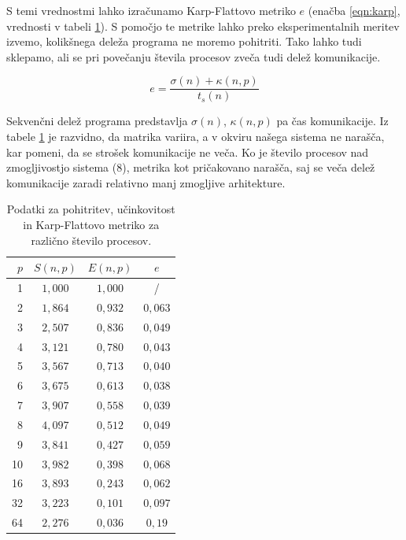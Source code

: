 \documentclass[a4paper,12pt]{book}
\begin{document}
S temi vrednostmi lahko izračunamo Karp-Flattovo metriko $e$ (enačba \ref{eqn:karp}, vrednosti v tabeli \ref{tab:efficiency-speedup-karp}). S pomočjo te metrike lahko preko eksperimentalnih meritev izvemo, kolikšnega deleža programa ne moremo pohitriti. Tako lahko tudi sklepamo, ali se pri povečanju števila procesov zveča tudi delež komunikacije. 

\begin{equation}
\label{eqn:karp}
e = \frac{\sigma(n) + \kappa(n,p)}{t_s(n)}
\end{equation}

Sekvenčni delež programa predstavlja $\sigma(n)$, $\kappa(n,p)$ pa čas komunikacije. Iz tabele \ref{tab:efficiency-speedup-karp} je razvidno, da matrika variira, a v okviru našega sistema ne narašča, kar pomeni, da se strošek komunikacije ne veča. Ko je število procesov nad zmogljivostjo sistema (8), metrika kot pričakovano narašča, saj se veča delež komunikacije zaradi relativno manj zmogljive arhitekture. 

\begin{table}
\centering
\caption{Podatki za pohitritev, učinkovitost in Karp-Flattovo metriko za različno število procesov. }
\label{tab:efficiency-speedup-karp}
\begin{tabular}{r | c | c | c}
$p$ & $S(n,p)$ & $E(n,p)$ & $e$ \\
\hline
1 & $1{,}000$ & $1{,}000$ & / \\
2 & $1{,}864$ & $0{,}932$ & $0{,}063$ \\
3 & $2{,}507$ & $0{,}836$ & $0{,}049$ \\
4 & $3{,}121$ & $0{,}780$ & $0{,}043$ \\
5 & $3{,}567$ & $0{,}713$ & $0{,}040$ \\
6 & $3{,}675$ & $0{,}613$ & $0{,}038$ \\
7 & $3{,}907$ & $0{,}558$ & $0{,}039$ \\
8 & $4{,}097$ & $0{,}512$ & $0{,}049$ \\
9 & $3{,}841$ & $0{,}427$ & $0{,}059$ \\
10 & $3{,}982$ & $0{,}398$ & $0{,}068$ \\
16 & $3{,}893$ & $0{,}243$ & $0{,}062$ \\
32 & $3{,}223$ & $0{,}101$ & $0{,}097$ \\
64 & $2{,}276$ & $0{,}036$ & $0{,}19$ \\
\end{tabular}
\end{table}
\end{document}
